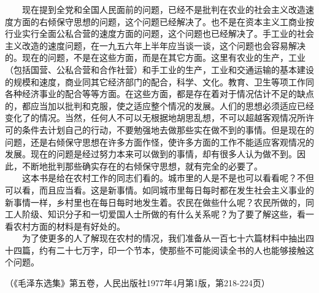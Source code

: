 \documentclass[cn,11pt,chinese]{elegantbook}
\begin{document}
　　现在提到全党和全国人民面前的问题，已经不是批判在农业的社会主义改造速度方面的右倾保守思想的问题，这个问题已经解决了。也不是在资本主义工商业按行业实行全面公私合营的速度方面的问题，这个问题也已经解决了。手工业的社会主义改造的速度问题，在一九五六年上半年应当谈一谈，这个问题也会容易解决的。现在的问题，不是在这些方面，而是在其它方面。这里有农业的生产，工业（包括国营、公私合营和合作社营）和手工业的生产，工业和交通运输的基本建设的规模和速度，商业同其它经济部门的配合，科学、文化。教育、卫生等项工作同各种经济事业的配合等等方面。在这些方面，都是存在着对于情况估计不足的缺点的，都应当加以批判和克服，使之适应整个情况的发展。人们的思想必须适应已经变化了的情况。当然，任何人不可以无根据地胡思乱想，不可以超越客观情况所许可的条件去计划自己的行动，不要勉强地去做那些实在做不到的事情。但是现在的问题，还是右倾保守思想在许多方面作怪，使许多方面的工作不能适应客观情况的发展。现在的问题是经过努力本来可以做到的事情，却有很多人认为做不到。因此，不断地批判那些确实存在的右倾保守思想，就有完全的必要了。\\
　　这本书是给在农村工作的同志们看的。城市里的人是不是也可以看看呢？不但可以看，而且应当看。这是新事情。如同城市里每日每时都在发生社会主义事业的新事情一样，乡村里也在每日每时地发生着。农民在做些什么呢？农民所做的，同工人阶级、知识分子和一切爱国人士所做的有什么关系呢？为了要了解这些，看一看农村方面的材料是有好处的。\\
　　为了使更多的人了解现在农村的情况，我们准备从一百七十六篇材料中抽出四十四篇，约有二十七万字，印一个节本，使那些不可能阅读全书的人也能够接触这个问题。\\
\begin{flushright}（《毛泽东选集》第五卷，人民出版社1977年4月第1版，第218-224页）\end{flushright}
\newpage

\end{document}
